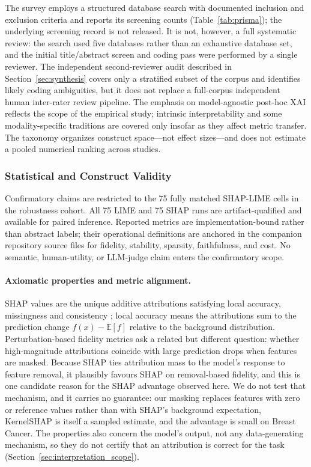 \documentclass[10pt,a4paper,twoside]{article}
\begin{document}
The survey employs a structured database search with documented inclusion
and exclusion criteria and reports its screening counts
(Table~\ref{tab:prisma}); the underlying screening record is not released.
It is not, however, a full systematic review:
the search used five databases rather than an exhaustive database set,
and the initial title/abstract screen and coding pass were performed by a
single reviewer. The independent second-reviewer audit described in
Section~\ref{sec:synthesis} covers only a stratified subset of the corpus
and identifies likely coding ambiguities, but it does not replace a
full-corpus independent human inter-rater review pipeline.
The emphasis on model-agnostic post-hoc XAI reflects the scope of the
empirical study; intrinsic interpretability and some modality-specific
traditions are covered only insofar as they affect metric transfer. The
taxonomy organizes construct space---not effect sizes---and does not
estimate a pooled numerical ranking across studies.

\subsubsection{Statistical and Construct Validity}

Confirmatory claims are restricted to the 75 fully matched SHAP-LIME
cells in the robustness cohort. All 75 LIME and 75 SHAP runs are artifact-qualified and available
for paired inference. Reported metrics are implementation-bound
rather than abstract labels; their operational definitions are anchored
in the companion repository source files for fidelity, stability,
sparsity, faithfulness, and cost. No semantic, human-utility, or
LLM-judge claim enters the confirmatory scope.

\paragraph{Axiomatic properties and metric alignment.}
SHAP values are the unique additive attributions satisfying local accuracy,
missingness and consistency \citep{lundberg2017unified}; local accuracy means
the attributions sum to the prediction change $f(x) - \mathbb{E}[f]$ relative
to the background distribution. Perturbation-based fidelity metrics ask a
related but different question: whether high-magnitude attributions coincide
with large prediction drops when features are masked. Because SHAP ties
attribution mass to the model's response to feature removal, it plausibly
favours SHAP on removal-based fidelity, and this is one candidate reason for
the SHAP advantage observed here. We do not test that mechanism, and it
carries no guarantee: our masking replaces features with zero or reference
values rather than with SHAP's background expectation, KernelSHAP is itself
a sampled estimate, and the advantage is small on Breast Cancer. The
properties also concern the model's output, not any data-generating
mechanism, so they do not certify that an attribution is correct for the
task (Section~\ref{sec:interpretation_scope}).
\end{document}
